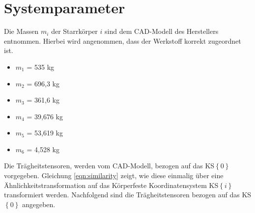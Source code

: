 \section{Systemparameter}
Die Massen $m_i$ der Starrkörper $i$ sind dem CAD-Modell des Herstellers entnommen. Hierbei wird angenommen, dass der Werkstoff korrekt zugeordnet ist. 
%
\begin{itemize}
	\item $m_1$ = 535 kg
	\item $m_2$ = 696,3 kg
	\item $m_3$ = 361,6 kg
	\item $m_4$ = 39,676 kg
	\item $m_5$ = 53,619 kg
	\item $m_6$ = 4,528 kg
\end{itemize}
%
Die Trägheitstensoren, werden vom CAD-Modell, bezogen auf das KS$\left\{0\right\}$ vorgegeben. Gleichung \ref{eqn:similarity} zeigt, wie diese einmalig über eine Ähnlichkeitstransformation auf das Körperfeste Koordinatensystem KS$\left\{i\right\}$ transformiert werden. Nachfolgend sind die Trägheitstensoren bezogen auf das KS$\left\{0\right\}$ angegeben. 
%

